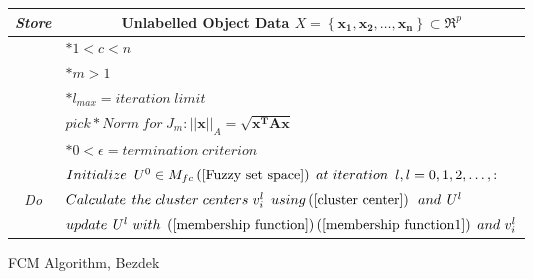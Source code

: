 \documentclass[english]{HSMW-Thesis}
\begin{document}
\begin{figure}[h!]\label{FCM Algorithm}
	\centering
	\caption{FCM Algorithm, Bezdek\cite{bezdek1981pattern}}\label{FCM Centers}
	
	\begin{tabular}{ l l }
		\cline{1-2}  \hline
		
		\multicolumn{1}{c|}{\emph{Store}} &\multicolumn{1}{c}{Unlabelled Object Data $X= \left\lbrace \mathbf{x_{1},x_{2},\ldots,x_{n}}\right\rbrace \subset \Re^{p}$  } \\ \hline
		\multicolumn{1}{c|}{} &$\ast 1<c<n$  \\ 
		\multicolumn{1}{c|}{} &$\ast m>1$ \\ 
		\multicolumn{1}{c|}{} &$\ast l_{max}= iteration\hspace{3pt} limit$  \\
		\multicolumn{1}{c|}{} &$pick \ast Norm\hspace{3pt} for\hspace{3pt} J_{m} :||\mathbf{x}||_{A}=\sqrt{\mathbf{x^{T}Ax}} $ \\
		\multicolumn{1}{c|}{} &$\ast0<\epsilon = termination \hspace{3pt} criterion$\\\hline
		\multicolumn{1}{c|}{} &$Initialize \hspace{5pt}U^{0} \in M_{fc}\left( \ref{Fuzzy set space}\right) \hspace{3pt} at\hspace{3pt} iteration\hspace{5pt} l,l= 0,1,2,\ldots,:$\\	\hline
		\multicolumn{1}{c|}{\emph{Do}} &$Calculate\hspace{4pt} the \hspace{3pt}cluster\hspace{3pt} centers\hspace{3pt} v_{i}^{l} \hspace{5pt}using\left( \ref{cluster center}\right) \hspace{5pt}  and \hspace{4pt}U^{l} $ \\ 
		\multicolumn{1}{c|}{} &$ update\hspace{4pt} U^{l} \hspace{3pt}with\hspace{3pt} \left( \ref{membership function}\right) \left( \ref{membership function1}\right)\hspace{3pt}  and\hspace{3pt}  v_{i}^{l}$ \\

\end{tabular}
\end{figure}
\end{document}
